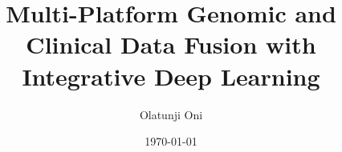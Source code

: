 \documentclass[12pt]{report}
\title{Multi-Platform Genomic and Clinical Data Fusion with Integrative Deep Learning}
\author{Olatunji Oni}
\date{\today}
\begin{document}
\maketitle


\frontmatter{}
    \tableofcontents

\mainmatter{}
    
    
\backmatter{}
    \printbibliography
\end{document}
